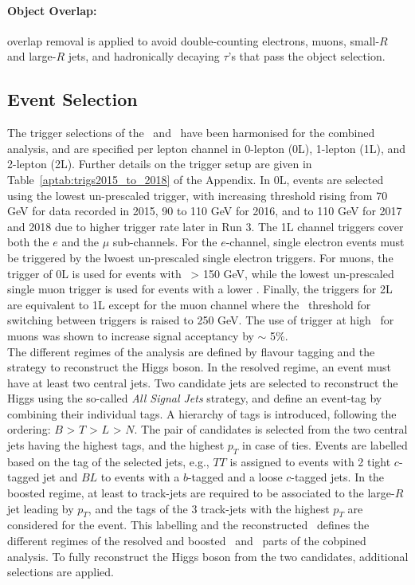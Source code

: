 \paragraph{Object Overlap:} overlap removal is applied to avoid double-counting electrons, muons, small-$R$ and large-$R$ jets, and hadronically decaying $\tau$'s that pass the object selection.

\subsection{Event Selection}\label{sec-regimeCat}
The trigger selections of the \vhb\ and \vhc\ have been harmonised for the combined analysis, and are specified per lepton channel in 0-lepton (0L), 1-lepton (1L), and 2-lepton (2L). Further details on the trigger setup are given in Table~\ref{aptab:trigs2015_to_2018} of the Appendix. In 0L, events are selected using the lowest un-prescaled \etm trigger, with increasing threshold rising from 70 GeV for data recorded in 2015, 90 to 110 GeV for 2016, and to 110 GeV for 2017 and 2018 due to higher trigger rate later in Run 3. The 1L channel triggers cover both the $e$ and the $\mu$ sub-channels. For the $e$-channel, single electron events must be triggered by the lwoest un-prescaled single electron triggers. For muons, the \etm trigger of 0L is used for events with \ptv\ > 150 GeV, while the lowest un-prescaled single muon trigger is used for events with a lower \ptv. Finally, the triggers for 2L are equivalent to 1L except for the muon channel where the \ptv\ threshold for switching between triggers is raised to 250 GeV. The use of \etm trigger at high \ptv\ for muons was shown to increase signal acceptancy by $\sim$ 5\%.\\ %


The different regimes of the analysis are defined by flavour tagging and the strategy to reconstruct the Higgs boson. In the resolved regime, an event must have at least two central jets. Two candidate jets are selected to reconstruct the Higgs using the so-called \textit{All Signal Jets} strategy, and define an event-tag by combining their individual tags. A hierarchy of tags is introduced, following the ordering: $B$ > $T$ > $L$ > $N$. The pair of candidates is selected from the two central jets having the highest tags, and the highest $p_T$ in case of ties. Events are labelled based on the tag of the selected jets, e.g., $TT$ is assigned to events with 2 tight $c$-tagged jet and $BL$ to events with a $b$-tagged and a loose $c$-tagged jets. In the boosted regime, at least to track-jets are required to be associated to the large-$R$ jet leading by $p_T$, and the tags of the 3 track-jets with the highest $p_T$ are considered for the event. This labelling and the reconstructed \ptv\ defines the different regimes of the resolved and boosted \vhb\ and \vhc\ parts of the cobpined analysis. To fully reconstruct the Higgs boson from the two candidates, additional selections are applied.

